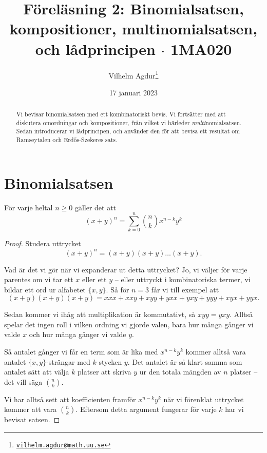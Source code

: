 \documentclass[nobib]{tufte-handout}
\title{Föreläsning 2: Binomialsatsen, kompositioner, multinomialsatsen, och lådprincipen $\cdot$ 1MA020}
\author[Vilhelm Agdur]{Vilhelm Agdur\thanks{\href{mailto:vilhelm.agdur@math.uu.se}{\nolinkurl{vilhelm.agdur@math.uu.se}}}}
\date{17 januari 2023}
\begin{document}
\maketitle%

\begin{abstract}
\noindent
Vi bevisar binomialsatsen med ett kombinatoriskt bevis. Vi fortsätter med att diskutera omordningar och kompositioner, från vilket vi härleder \emph{multi}nomialsatsen. Sedan introducerar vi lådprincipen, och använder den för att bevisa ett resultat om Ramseytalen och Erd\H{o}s-Szekeres sats.
\end{abstract}

\section{Binomialsatsen}

\begin{theorem}[Binomialsatsen]
  För varje heltal $n\geq 0$ gäller det att
  $$(x + y)^n = \sum_{k=0}^n \binom{n}{k}x^{n-k}y^k$$
  \begin{proof}
    Studera uttrycket
    $$(x + y)^n = (x + y)(x + y)\ldots(x + y).$$

    Vad är det vi gör när vi expanderar ut detta uttrycket? Jo, vi väljer för varje parentes om vi tar ett $x$ eller ett $y$ -- eller uttryckt i kombinatoriska termer, vi bildar ett ord ur alfabetet $\{x, y\}$. Så för $n = 3$ får vi till exempel att
    $$(x+y)(x+y)(x+y) = xxx + xxy + xyy + yxx + yxy + yyy + xyx + yyx.$$

    Sedan kommer vi ihåg att multiplikation är kommutativt, så $xyy = yxy$. Alltså spelar det ingen roll i vilken ordning vi gjorde valen, bara hur många gånger vi valde $x$ och hur många gånger vi valde $y$.

    Så antalet gånger vi får en term som är lika med $x^{n-k}y^k$ kommer alltså vara antalet $\{x, y\}$-strängar med $k$ stycken $y$. Det antalet är så klart samma som antalet sätt att välja $k$ platser att skriva $y$ ur den totala mängden av $n$ platser -- det vill säga $\binom{n}{k}$.

    Vi har alltså sett att koefficienten framför $x^{n-k}y^k$ när vi förenklat uttrycket kommer att vara $\binom{n}{k}$. Eftersom detta argument fungerar för varje $k$ har vi bevisat satsen.
  \end{proof}
\end{theorem}
\end{document}
